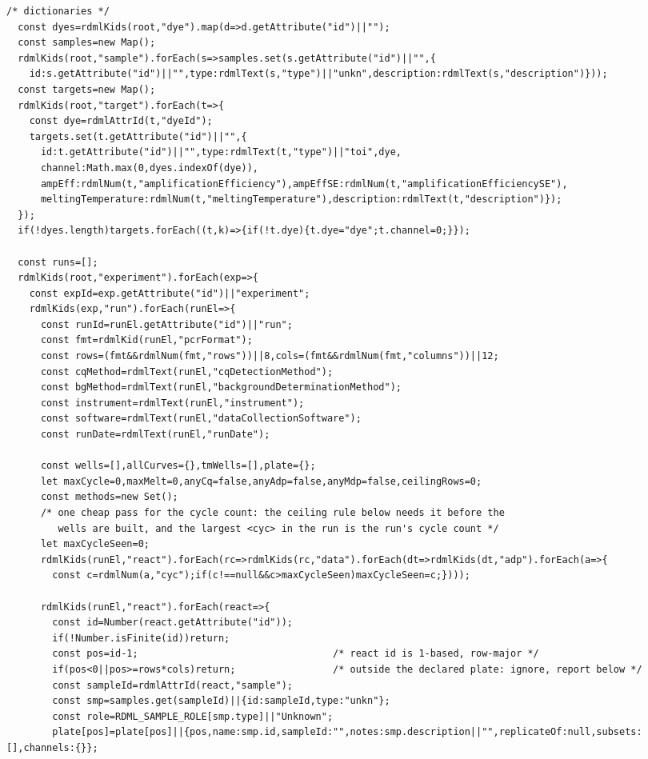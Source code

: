 \begin{multicols}{2}
\begin{lstlisting}[style=jstiny]
  /* dictionaries */
  const dyes=rdmlKids(root,"dye").map(d=>d.getAttribute("id")||"");
  const samples=new Map();
  rdmlKids(root,"sample").forEach(s=>samples.set(s.getAttribute("id")||"",{
    id:s.getAttribute("id")||"",type:rdmlText(s,"type")||"unkn",description:rdmlText(s,"description")}));
  const targets=new Map();
  rdmlKids(root,"target").forEach(t=>{
    const dye=rdmlAttrId(t,"dyeId");
    targets.set(t.getAttribute("id")||"",{
      id:t.getAttribute("id")||"",type:rdmlText(t,"type")||"toi",dye,
      channel:Math.max(0,dyes.indexOf(dye)),
      ampEff:rdmlNum(t,"amplificationEfficiency"),ampEffSE:rdmlNum(t,"amplificationEfficiencySE"),
      meltingTemperature:rdmlNum(t,"meltingTemperature"),description:rdmlText(t,"description")});
  });
  if(!dyes.length)targets.forEach((t,k)=>{if(!t.dye){t.dye="dye";t.channel=0;}});

  const runs=[];
  rdmlKids(root,"experiment").forEach(exp=>{
    const expId=exp.getAttribute("id")||"experiment";
    rdmlKids(exp,"run").forEach(runEl=>{
      const runId=runEl.getAttribute("id")||"run";
      const fmt=rdmlKid(runEl,"pcrFormat");
      const rows=(fmt&&rdmlNum(fmt,"rows"))||8,cols=(fmt&&rdmlNum(fmt,"columns"))||12;
      const cqMethod=rdmlText(runEl,"cqDetectionMethod");
      const bgMethod=rdmlText(runEl,"backgroundDeterminationMethod");
      const instrument=rdmlText(runEl,"instrument");
      const software=rdmlText(runEl,"dataCollectionSoftware");
      const runDate=rdmlText(runEl,"runDate");

      const wells=[],allCurves={},tmWells=[],plate={};
      let maxCycle=0,maxMelt=0,anyCq=false,anyAdp=false,anyMdp=false,ceilingRows=0;
      const methods=new Set();
      /* one cheap pass for the cycle count: the ceiling rule below needs it before the
         wells are built, and the largest <cyc> in the run is the run's cycle count */
      let maxCycleSeen=0;
      rdmlKids(runEl,"react").forEach(rc=>rdmlKids(rc,"data").forEach(dt=>rdmlKids(dt,"adp").forEach(a=>{
        const c=rdmlNum(a,"cyc");if(c!==null&&c>maxCycleSeen)maxCycleSeen=c;})));

      rdmlKids(runEl,"react").forEach(react=>{
        const id=Number(react.getAttribute("id"));
        if(!Number.isFinite(id))return;
        const pos=id-1;                                  /* react id is 1-based, row-major */
        if(pos<0||pos>=rows*cols)return;                 /* outside the declared plate: ignore, report below */
        const sampleId=rdmlAttrId(react,"sample");
        const smp=samples.get(sampleId)||{id:sampleId,type:"unkn"};
        const role=RDML_SAMPLE_ROLE[smp.type]||"Unknown";
        plate[pos]=plate[pos]||{pos,name:smp.id,sampleId:"",notes:smp.description||"",replicateOf:null,subsets:[],channels:{}};


\end{lstlisting}
\end{multicols}
